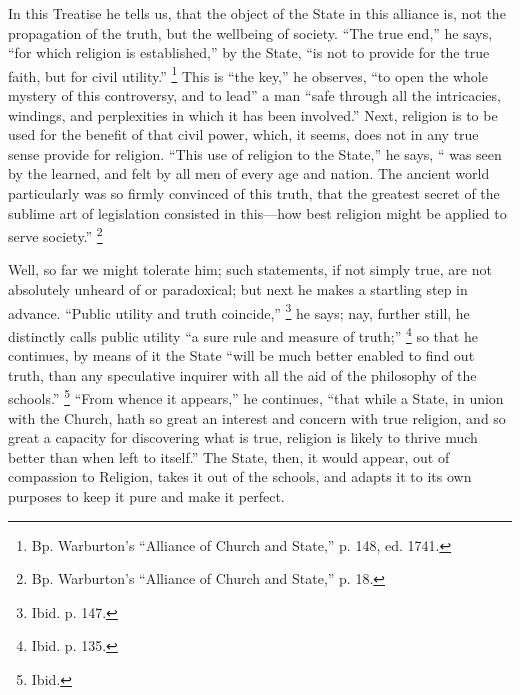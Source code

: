 In this Treatise he tells us, that the object of the State in this
alliance is, not the propagation of the truth, but the wellbeing of
society. ``The true end,'' he says, ``for which religion
is established,'' by the State, ``is not to provide for the
true faith, but for civil utility.'' \footnote{Bp. Warburton's ``Alliance of Church and
State,'' p. 148, ed. 1741.} This is ``the key,'' he observes, ``to open the
whole mystery of this controversy, and to lead'' a man ``safe
through all the intricacies, windings, and perplexities in which it
has been involved.'' Next, religion is to be used for the benefit
of that civil power, which, it seems, does not in any true sense
provide for religion. ``This use of religion to the State,''
he says, `` was seen by the learned, and felt by all men of every
age and nation. The ancient world particularly was so firmly convinced
of this truth, that the greatest secret of the sublime art of
legislation consisted in this—how best religion might be applied to
serve society.'' \footnote{Bp. Warburton's ``Alliance of Church and
State,'' p. 18.}

Well, so far we might tolerate him; such statements, if not simply
true, are not absolutely unheard of or paradoxical; but next he makes
a startling step in advance. ``Public utility and truth
coincide,'' \footnote{Ibid. p. 147.} he says;
nay, further still, he distinctly calls public utility ``a sure
rule and measure of truth;'' \footnote{Ibid. p. 135.} so that he continues, by means of it the State ``will be
much better enabled to find out truth, than any speculative inquirer
with all the aid of the philosophy of the schools.'' \footnote{Ibid.} ``From whence it appears,'' he continues, ``that
while a State, in union with the Church, hath so great an interest and
concern with true religion, and so great a capacity for discovering
what is true, religion is likely to thrive much better than when left
to itself.'' The State, then, it would appear, out of compassion
to Religion, takes it out of the schools, and adapts it to its own
purposes to keep it pure and make it perfect.

